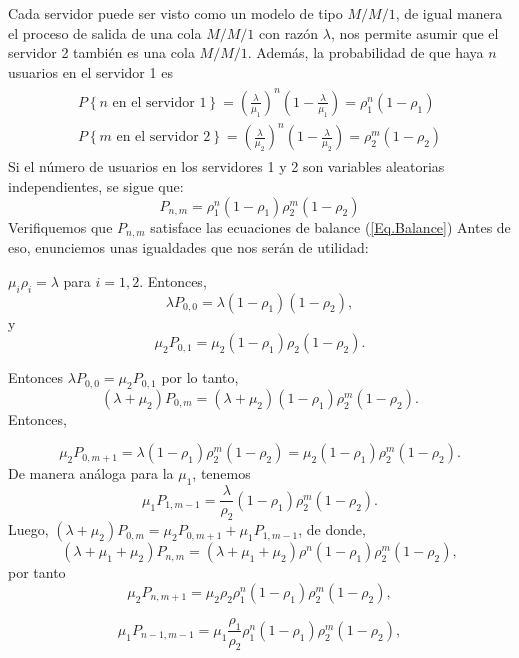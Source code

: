 \documentclass{article}
\numberwithin{equation}{section}
\begin{document}
Cada servidor puede ser visto como un modelo de tipo $M/M/1$, de igual manera el proceso de salida de una cola $M/M/1$ con raz\'on $\lambda$, nos permite asumir que el servidor 2 tambi\'en es una cola $M/M/1$. Adem\'as, la probabilidad de que haya $n$ usuarios en el servidor 1 es
\begin{eqnarray}
\begin{array}{l}
P\left\{n\textrm{ en el servidor }1\right\}=\left(\frac{\lambda}{\mu_{1}}\right)^{n}\left(1-\frac{\lambda}{\mu_{1}}\right)=\rho_{1}^{n}\left(1-\rho_{1}\right)\\
P\left\{m\textrm{ en el servidor }2\right\}=\left(\frac{\lambda}{\mu_{2}}\right)^{n}\left(1-\frac{\lambda}{\mu_{2}}\right)=\rho_{2}^{m}\left(1-\rho_{2}\right)
\end{array}
\end{eqnarray}
Si el n\'umero de usuarios en los servidores 1 y 2 son variables aleatorias independientes, se sigue que:
\begin{equation}\label{Eq.8.16}
P_{n,m}=\rho_{1}^{n}\left(1-\rho_{1}\right)\rho_{2}^{m}\left(1-\rho_{2}\right)
\end{equation}
Verifiquemos que $P_{n,m}$ satisface las ecuaciones de balance (\ref{Eq.Balance}) Antes de eso, enunciemos unas igualdades que nos ser\'an de utilidad:

$\mu_{i}\rho_{i}=\lambda$ para $i=1,2.$ Entonces, \[\lambda P_{0,0}=\lambda\left(1-\rho_{1}\right)\left(1-\rho_{2}\right),\] y \[\mu_{2} P_{0,1}=\mu_{2}\left(1-\rho_{1}\right)\rho_{2}\left(1-\rho_{2}\right).\]

Entonces $\lambda P_{0,0}=\mu_{2} P_{0,1}$ por lo tanto, \[\left(\lambda+\mu_{2}\right)P_{0,m}=\left(\lambda+\mu_{2}\right)\left(1-\rho_{1}\right)\rho_{2}^{m}\left(1-\rho_{2}\right).\] Entonces,

\[\mu_{2}P_{0,m+1}=\lambda\left(1-\rho_{1}\right)\rho_{2}^{m}\left(1-\rho_{2}\right)=\mu_{2}\left(1-\rho_{1}\right)\rho_{2}^{m}\left(1-\rho_{2}\right).\] De manera an\'aloga para la $\mu_1$, tenemos \[\mu_{1}P_{1,m-1}=\frac{\lambda}{\rho_{2}}\left(1-\rho_{1}\right)\rho_{2}^{m}\left(1-\rho_{2}\right).\] Luego, $\left(\lambda+\mu_{2}\right)P_{0,m}=\mu_{2}P_{0,m+1}+\mu_{1}P_{1,m-1}$, de donde, 
\[\left(\lambda+\mu_{1}+\mu_{2}\right)P_{n,m}=\left(\lambda+\mu_{1}+\mu_{2}\right)\rho^{n}\left(1-\rho_{1}\right)\rho_{2}^{m}\left(1-\rho_{2}\right),\]
por tanto
\[\mu_{2}P_{n,m+1}=\mu_{2}\rho_{2}\rho_{1}^{n}\left(1-\rho_{1}\right)\rho_{2}^{m}\left(1-\rho_{2}\right),\]

\[\mu_{1} P_{n-1,m-1}=\mu_{1}\frac{\rho_{1}}{\rho_{2}}\rho_{1}^{n}\left(1-\rho_{1}\right)\rho_{2}^{m}\left(1-\rho_{2}\right),\]
\end{document}
